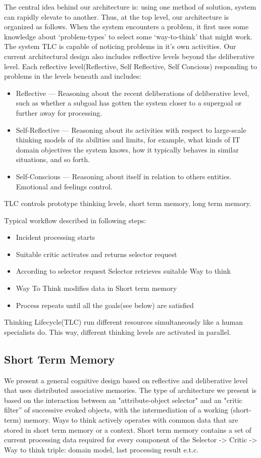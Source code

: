 \documentclass[runningheads,a4paper]{llncs}
\begin{document}
The central idea behind our architecture is: using one method of solution, system can rapidly elevate to another. Thus, at the top level, our architecture is organized as follows. When the system encounters a problem, it first uses some knowledge about ‘problem-types’ to select some ‘way-to-think’ that might work.
The system TLC is capable of noticing problems in it's own activities. Our current architectural design also includes reflective levels beyond the deliberative level. Each reflective level(Reflective, Self Reflective, Self Concious) responding to problems in the levels beneath and includes:
\begin{itemize}
 \item Reflective — Reasoning about the recent deliberations of deliberative level, such as whether a subgoal has gotten the system closer to a supergoal or further away for processing.
 \item Self-Reflective — Reasoning about its activities with respect to large-scale thinking models of its abilities and limits, for example, what kinds of  IT domain objectives  the system knows, how it typically behaves in similar situations, and so forth.
 \item Self-Conscious — Reasoning about itself in relation to others entities. Emotional and feelings control.
\end{itemize}

TLC controls prototype thinking levels, short term memory, long term memory.

Typical workflow described in following steps:
\begin{itemize}
 \item Incident processing starts
 \item Suitable critic activates and returns selector request
 \item According to selector request Selector retrieves suitable Way to think
 \item Way To Think modifies data in Short term memory
 \item Process repeats until all the goals(see below) are satisfied
\end{itemize}

Thinking Lifecycle(TLC) run different resources simultaneously like a human specialists do. This way, different thinking levels are activated in parallel.

\subsection{Short Term Memory}
We present a general cognitive design based on reflective and deliberative level that uses distributed associative memories. The type of architecture we present is based on the interaction between an "attribute-object selector" and an "critic filter” of successive evoked objects, with the intermediation of a working (short-term) memory.
Ways to think actively operates with common data that are stored in short term memory or a context. Short term memory contains a set of current processing data required for every component of the Selector -> Critic -> Way to think triple: domain model, last processing result e.t.c.
\end{document}
